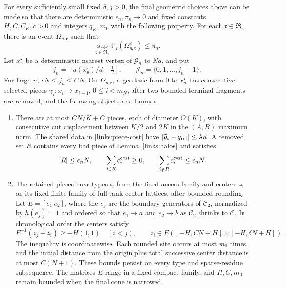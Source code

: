 \begin{proposition}
\label{links:extraction}
For every sufficiently small fixed \(\delta,\eta>0\), the final
geometric choices above can be made so that there are deterministic
\(\epsilon_n,\pi_n\to0\) and fixed constants \(H,C,C_K,c>0\) and
integers \(q_K,m_0\) with the following property. For each
\(\mathfrak r\in\mathfrak R_n\) there is an event \(\Omega_{n,\mathfrak r}\)
such that
\begin{equation}
 \sup_{\mathfrak r\in\mathfrak R_n}
 \mathbb P_{\mathfrak r}(\Omega_{n,\mathfrak r}^{\,c})\le\pi_n.
 \label{links:extraction-event}
\end{equation}
Let \(x_n^\star\) be a deterministic nearest vertex of \(\mathcal G_n\)
to \(Na\), and put
\[
 j_n=\left\lfloor u(x_n^\star)/d+\tfrac12\right\rfloor,\qquad
 \mathcal J_n=\{0,1,\ldots,j_n-1\}.
\]
For large \(n\), \(cN\le j_n\le CN\). On \(\Omega_{n,\mathfrak r}\),
a geodesic from \(0\) to \(x_n^\star\) has consecutive selected pieces
\(\gamma_i:x_i\to x_{i+1}\), \(0\le i<m_N\), after two bounded terminal
fragments are removed, and the following objects and bounds.
\begin{enumerate}
\item There are at most \(CN/K+C\) pieces, each of diameter \(O(K)\),
with consecutive cut displacement between \(K/2\) and \(2K\) in the
\((A,B)\) maximum norm. The shared data in
\eqref{links:piece-cost} have
\(|\widetilde g_i-g_{\rm ref}|\le\lambda n\). A removed set \(R\)
contains every bad piece of Lemma~\ref{links:halos} and satisfies
\begin{equation}
 |R|\le\epsilon_nN,\qquad
 \sum_{i\in R}c_i^{\rm cost}\ge0,\qquad
 \sum_{i\notin R}c_i^{\rm cost}\le\epsilon_nN.
 \label{links:retained-cost}
\end{equation}

\item The retained pieces have types \(t_i\) from the fixed access
family and centers \(z_i\) on its fixed finite family of full-rank
center lattices, after bounded rounding. Let \(E=[e_1\ e_2]\), where
the \(e_j\) are the boundary generators of \(\mathcal C_2\), normalized
by \(h(e_j)=1\) and ordered so that \(e_1\to a\) and \(e_2\to b\)
as \(\mathcal C_2\) shrinks to \(\mathcal C\). In
chronological order the centers satisfy
\begin{equation}
 E^{-1}(z_j-z_i)\ge-H(1,1)\quad(i<j),\qquad
 z_i\in E([-H,CN+H]\times[-H,\delta N+H]).
 \label{links:retained-geometry}
\end{equation}
The inequality is coordinatewise. Each rounded site occurs at most
\(m_0\) times, and the initial distance from the origin plus total
successive center distance is at most \(C(N+1)\). These bounds persist
on every type and sparse-residue subsequence. The matrices \(E\) range
in a fixed compact family, and \(H,C,m_0\) remain bounded when the
final cone is narrowed.


\end{enumerate}
\end{proposition}
